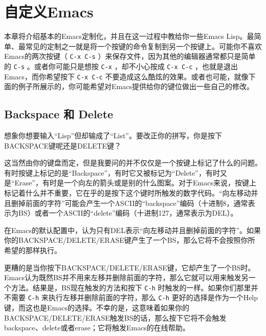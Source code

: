 \chapter{自定义Emacs}
\label{chapter:01-Customizing-Emacs}


本章将介绍基本的Emacs定制化，并且在这一过程中教给你一些Emacs Lisp。最简单、最常见的定制之一就是将一个按键的命令复制到另一个按键上。可能你不喜欢Emacs的两次按键（ \verb|C-x C-s| ）来保存文件，因为其他的编辑器通常都只是简单的 \verb|C-s| 。或者你可能只是想按 \verb|C-x| ，却不小心按成 \verb|C-x C-c| ，也就是退出Emacs，而你希望按下 \verb|C-x C-c| 不要造成这么酷炫的效果。或者也可能，就像下面的例子所展示的，你可能希望对Emacs提供给你的键位做出一些自己的修改。

\section{Backspace 和 Delete}
\label{section:01-Backspace-and-Delete}

想象你想要输入“Lisp”但却输成了“List”。要改正你的拼写，你是按下BACKSPACE键呢还是DELETE键？

这当然由你的键盘而定，但是我要问的并不仅仅是一个按键上标记了什么的问题。有时按键上标记的是“Backspace”，有时它又被标记为“Delete”，有时又是“Erase”，有时是一个向左的箭头或是别的什么图案。对于Emacs来说，按键上标记着什么并不重要，它在乎的是按下这个键时所触发的数字代码。“向左移动并且删掉前面的字符”可能会产生一个ASCII的“backspace”编码（十进制8，通常表示为BS）或者一个ASCII的“delete”编码（十进制127，通常表示为DEL）。

在Emacs的默认配置中，认为只有DEL表示“向左移动并且删掉前面的字符”。如果你的BACKSPACE/DELETE/ERASE键产生了一个BS，那么它将不会按照你所希望的那样执行。

更糟的是当你按下BACKSPACE/DELETE/ERASE键，它却产生了一个BS时。Emacs认为既然BS并不用来左移并删除前面的字符，那么它就可以用来触发另一个方法。结果是，BS现在触发的方法和按下 \verb|C-h| 时触发的一样。如果你们那里并不需要 \verb|C-h| 来执行左移并删除前面的字符，那么 \verb|C-h| 更好的选择是作为一个Help键，而这也是Emacs的选择。不幸的是，这意味着如果你的BACKSPACE/DELETE/ERASE触发BS的话，那么按下它将不会触发backspace、delete或者erase；它将触发Emacs的在线帮助。

